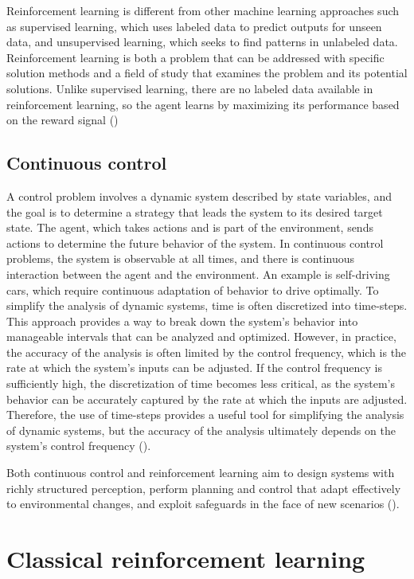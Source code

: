 Reinforcement learning is different from other machine learning approaches such as supervised learning, which uses labeled data to predict outputs for unseen data, and unsupervised learning, which seeks to find patterns in unlabeled data. Reinforcement learning is both a problem that can be addressed with specific solution methods and a field of study that examines the problem and its potential solutions. Unlike supervised learning, there are no labeled data available in reinforcement learning, so the agent learns by maximizing its performance based on the reward signal (\cite{sutton_reinforcement_1998})

\subsection{Continuous control}
A control problem involves a dynamic system described by state variables, and the goal is to determine a strategy that leads the system to its desired target state. The agent, which takes actions and is part of the environment, sends actions to determine the future behavior of the system. In continuous control problems, the system is observable at all times, and there is continuous interaction between the agent and the environment. An example is self-driving cars, which require continuous adaptation of behavior to drive optimally. To simplify the analysis of dynamic systems, time is often discretized into time-steps. This approach provides a way to break down the system's behavior into manageable intervals that can be analyzed and optimized. However, in practice, the accuracy of the analysis is often limited by the control frequency, which is the rate at which the system's inputs can be adjusted. If the control frequency is sufficiently high, the discretization of time becomes less critical, as the system's behavior can be accurately captured by the rate at which the inputs are adjusted. Therefore, the use of time-steps provides a useful tool for simplifying the analysis of dynamic systems, but the accuracy of the analysis ultimately depends on the system's control frequency (\cite{franklin_feedback_2014}).

Both continuous control and reinforcement learning aim to design systems with richly structured perception, perform planning and control that adapt effectively to environmental changes, and exploit safeguards in the face of new scenarios (\cite{recht_tour_2018}).


\section{Classical reinforcement learning}

